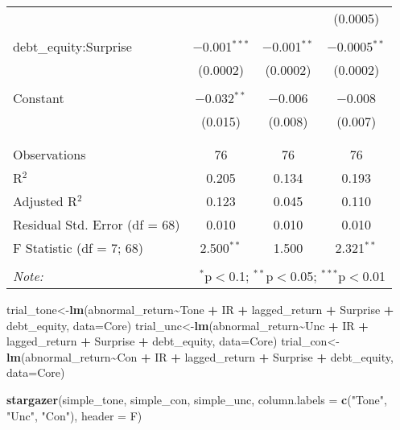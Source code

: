 \documentclass[
]{article}
\newenvironment{Shaded}{\begin{snugshade}}{\end{snugshade}}
\newcommand{\AttributeTok}[1]{\textcolor[rgb]{0.13,0.29,0.53}{#1}}
\newcommand{\FunctionTok}[1]{\textcolor[rgb]{0.13,0.29,0.53}{\textbf{#1}}}
\newcommand{\NormalTok}[1]{#1}
\newcommand{\OtherTok}[1]{\textcolor[rgb]{0.56,0.35,0.01}{#1}}
\newcommand{\SpecialCharTok}[1]{\textcolor[rgb]{0.81,0.36,0.00}{\textbf{#1}}}
\newcommand{\StringTok}[1]{\textcolor[rgb]{0.31,0.60,0.02}{#1}}
\begin{document}
\begin{table}[!htbp]
\begin{tabular}{@{\extracolsep{5pt}}lccc}
  &  &  & (0.0005) \\ 
  & & & \\ 
 debt\_equity:Surprise & $-$0.001$^{***}$ & $-$0.001$^{**}$ & $-$0.0005$^{**}$ \\ 
  & (0.0002) & (0.0002) & (0.0002) \\ 
  & & & \\ 
 Constant & $-$0.032$^{**}$ & $-$0.006 & $-$0.008 \\ 
  & (0.015) & (0.008) & (0.007) \\ 
  & & & \\ 
\hline \\[-1.8ex] 
Observations & 76 & 76 & 76 \\ 
R$^{2}$ & 0.205 & 0.134 & 0.193 \\ 
Adjusted R$^{2}$ & 0.123 & 0.045 & 0.110 \\ 
Residual Std. Error (df = 68) & 0.010 & 0.010 & 0.010 \\ 
F Statistic (df = 7; 68) & 2.500$^{**}$ & 1.500 & 2.321$^{**}$ \\ 
\hline 
\hline \\[-1.8ex] 
\textit{Note:}  & \multicolumn{3}{r}{$^{*}$p$<$0.1; $^{**}$p$<$0.05; $^{***}$p$<$0.01} \\ 
\end{tabular} 
\end{table}

\begin{Shaded}
\begin{Highlighting}[]
\NormalTok{trial\_tone}\OtherTok{\textless{}{-}}\FunctionTok{lm}\NormalTok{(abnormal\_return}\SpecialCharTok{\textasciitilde{}}\NormalTok{Tone }\SpecialCharTok{+}\NormalTok{ IR }\SpecialCharTok{+}\NormalTok{ lagged\_return }\SpecialCharTok{+}\NormalTok{ Surprise }\SpecialCharTok{+}\NormalTok{ debt\_equity, }\AttributeTok{data=}\NormalTok{Core)}
\NormalTok{trial\_unc}\OtherTok{\textless{}{-}}\FunctionTok{lm}\NormalTok{(abnormal\_return}\SpecialCharTok{\textasciitilde{}}\NormalTok{Unc }\SpecialCharTok{+}\NormalTok{ IR }\SpecialCharTok{+}\NormalTok{ lagged\_return }\SpecialCharTok{+}\NormalTok{ Surprise }\SpecialCharTok{+}\NormalTok{ debt\_equity, }\AttributeTok{data=}\NormalTok{Core)}
\NormalTok{trial\_con}\OtherTok{\textless{}{-}}\FunctionTok{lm}\NormalTok{(abnormal\_return}\SpecialCharTok{\textasciitilde{}}\NormalTok{Con }\SpecialCharTok{+}\NormalTok{ IR }\SpecialCharTok{+}\NormalTok{ lagged\_return }\SpecialCharTok{+}\NormalTok{ Surprise }\SpecialCharTok{+}\NormalTok{ debt\_equity, }\AttributeTok{data=}\NormalTok{Core)}

\FunctionTok{stargazer}\NormalTok{(simple\_tone, simple\_con, simple\_unc, }
          \AttributeTok{column.labels =} \FunctionTok{c}\NormalTok{(}\StringTok{"Tone"}\NormalTok{, }\StringTok{"Unc"}\NormalTok{, }\StringTok{"Con"}\NormalTok{), }\AttributeTok{header =}\NormalTok{ F)}
\end{Highlighting}
\end{Shaded}
\end{document}
